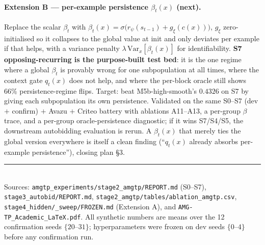 \documentclass[11pt]{article}
\begin{document}
\paragraph{Extension B --- per-example persistence $\beta_t(x)$ (next).}
Replace the scalar $\beta_t$ with
$\beta_t(x)=\sigma\big(r_\psi(s_{t-1}) + g_\xi(c(x))\big)$, $g_\xi$
zero-initialised so it collapses to the global value at init and only deviates
per example if that helps, with a variance penalty
$\lambda\,\mathrm{Var}_x[\beta_t(x)]$ for identifiability. \textbf{S7
opposing-recurring is the purpose-built test bed}: it is the one regime where a
global $\beta_t$ is provably wrong for one subpopulation at all times, where the
context gate $q_t(x)$ does not help, and where the per-block oracle still shows
66\% persistence-regime flips. Target: beat M5b-high-smooth's $0.4326$ on S7 by
giving each subpopulation its own persistence. Validated on the same
S0--S7 (dev $+$ confirm) $+$ Avazu $+$ Criteo battery with ablations A11--A13, a
per-group $\beta$ trace, and a per-group oracle-persistence diagnostic; if it
wins S7/S4/S5, the downstream autobidding evaluation is rerun. A $\beta_t(x)$
that merely ties the global version everywhere is itself a clean finding
(``$q_t(x)$ already absorbs per-example persistence''), closing plan \S3.

\vfill
\noindent\rule{\linewidth}{0.4pt}\\[2pt]
{\footnotesize Sources: \texttt{amgtp\_experiments/stage2\_amgtp/REPORT.md}
(S0--S7), \texttt{stage3\_autobid/REPORT.md},
\texttt{stage2\_amgtp/tables/ablation\_amgtp.csv},
\texttt{stage4\_hidden/\_sweep/FROZEN.md} (Extension A), and
\texttt{AMG-TP\_Academic\_LaTeX.pdf}. All synthetic numbers are means over the
12 confirmation seeds $\{20\text{--}31\}$; hyperparameters were frozen on dev
seeds $\{0\text{--}4\}$ before any confirmation run.}
\end{document}
